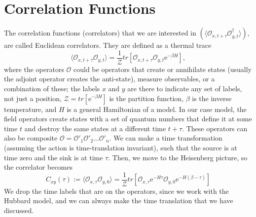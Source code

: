 \section{Correlation Functions}
\label{sec:corr_func}

The correlation functions (correlators) that we are interested in $\left(\langle \mathcal{O}_{x,t+\tau}\mathcal{O}^\dagger_{y,t} \rangle\right)$, are called Euclidean correlators. They are defined as a thermal trace
\begin{equation}
    \langle \mathcal{O}_{x,t+\tau}\mathcal{O}_{y,t} \rangle = \frac{1}{\mathcal{Z}}tr\left[ \mathcal{O}_{x,t+\tau}\mathcal{O}_{y,t}\mathrm{e}^{-\beta H} \right],
    \label{eq:corr_trerm}
\end{equation}
where the operators $\mathcal{O}$ could be operators that create or annihilate states (usually the adjoint operator creates the anti-state), measure observables, or a combination of these; the labels $x$ and $y$ are there to indicate any set of labels, not just a position, $\mathcal{Z} = tr\left[ \mathrm{e}^{-\beta H} \right]$ is the partition function, $\beta$ is the inverse temperature, and $H$ is a general Hamiltonian of a model. In our case model, the field operators create states with a set of quantum numbers that define it at some time $t$ and destroy the same states at a different time $t + \tau$. These operators can also be composite $\mathcal{O} = \mathcal{O'}_1\mathcal{O'}_2\hdots\mathcal{O'}_n$. We can make a time transformation (assuming the action is time-translation invariant), such that the source is at time zero and the sink is at time $\tau$. Then, we move to the Heisenberg picture, so the correlator becomes
\begin{equation}
    C_{xy}(\tau) := \langle \mathcal{O}_{x,\tau}\mathcal{O}_{y,0} \rangle = \frac{1}{\mathcal{Z}}tr\left[ \mathcal{O}_{x,\tau}\mathrm{e}^{-H\tau}\mathcal{O}_{y,0}\mathrm{e}^{-H(\beta - \tau)} \right]
\end{equation}
We drop the time labels that are on the operators, since we work with the Hubbard model, and we can always make the time translation that we have discussed.

